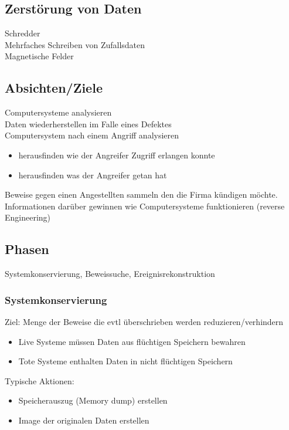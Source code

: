 \documentclass{article} %
\begin{document}
\subsection{Zerstörung von Daten}
Schredder\\
Mehrfaches Schreiben von Zufallsdaten\\
Magnetische Felder\\
\subsection{Absichten/Ziele}
Computersysteme analysieren\\
Daten wiederherstellen im Falle eines Defektes\\
Computersystem nach einem Angriff analysieren
\begin{itemize}
	\item herausfinden wie der Angreifer Zugriff erlangen konnte
    \item herausfinden was der Angreifer getan hat
\end{itemize}
Beweise gegen einen Angestellten sammeln den die Firma kündigen möchte.\\
Informationen darüber gewinnen wie Computersysteme funktionieren (reverse Engineering)
\subsection{Phasen}
Systemkonservierung, Beweissuche, Ereignisrekonstruktion\\
\subsubsection{Systemkonservierung}
Ziel: Menge der Beweise die evtl überschrieben werden reduzieren/verhindern
\begin{itemize}
	\item Live Systeme müssen Daten aus flüchtigen Speichern bewahren
    \item Tote Systeme enthalten Daten in nicht flüchtigen Speichern
\end{itemize}
Typische Aktionen:
\begin{itemize}
	\item Speicherauszug (Memory dump) erstellen
    \item Image der originalen Daten erstellen
\end{itemize}
\end{document}
